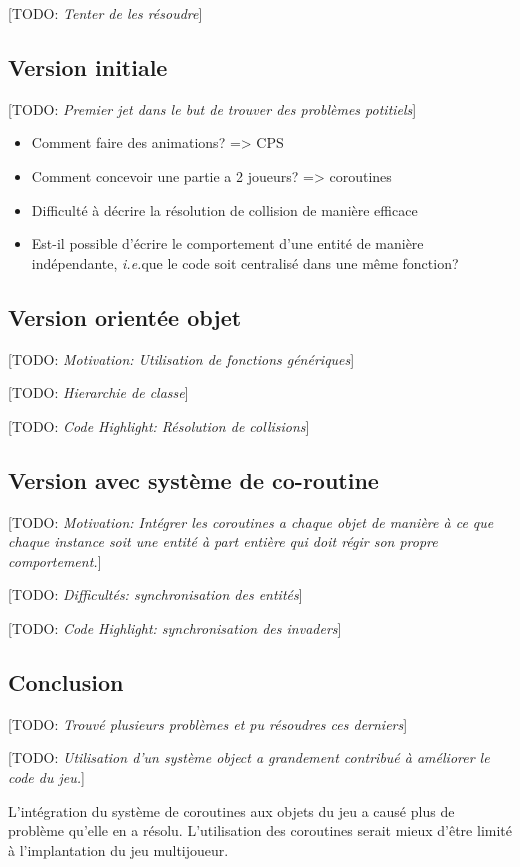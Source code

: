 \documentclass[12pt,oneside,letterpaper,francais]{book}
\newcommand{\todo}[1]{[TODO: {\it #1}]}
\newcommand{\ie}{{\textit{i.e.}}}
\begin{document}
\todo{Tenter de les résoudre}

\subsection{Version initiale}
\todo{Premier jet dans le but de trouver des problèmes potitiels}

\begin{itemize}
\item Comment faire des animations? => CPS
\item Comment concevoir une partie a 2 joueurs? => coroutines
\item Difficulté à décrire la résolution de collision de manière
  efficace 
\item Est-il possible d'écrire le comportement d'une entité de manière
  indépendante, \ie que le code soit centralisé dans une même
  fonction?
\end{itemize}

\subsection{Version orientée objet}
\todo{Motivation: Utilisation de fonctions génériques}

\todo{Hierarchie de classe}

\todo{Code Highlight: Résolution de collisions}


\subsection{Version avec système de co-routine}
\todo{Motivation: Intégrer les coroutines a chaque objet de manière à
  ce que chaque instance soit une entité à part entière qui doit régir
  son propre comportement.}

\todo{Difficultés: synchronisation des entités}

\todo{Code Highlight: synchronisation des invaders}


\subsection{Conclusion}
\todo{Trouvé plusieurs problèmes et pu résoudres ces derniers}

\todo{Utilisation d'un système object a grandement contribué à
  améliorer le code du jeu.}

L'intégration du système de coroutines aux objets du jeu a causé plus
de problème qu'elle en a résolu. L'utilisation des coroutines serait
mieux d'être limité à l'implantation du jeu multijoueur.
\end{document}
